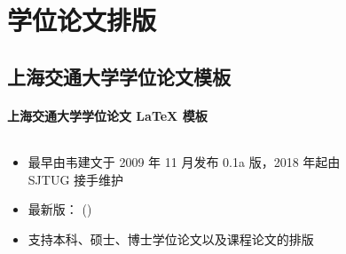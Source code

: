 

\section{学位论文排版}
\subsection{\SJTUThesis 上海交通大学学位论文模板}

\begin{frame}{\SJTUThesis}
  \framesubtitle{上海交通大学学位论文 \LaTeX{} 模板}
  \begin{columns}
    \begin{column}{.7\textwidth}
      \begin{itemize}
        \item 最早由韦建文于 2009 年 11 月发布 0.1a 版，2018 年起由 SJTUG 接手维护
        \item 最新版：\SJTUThesisVersion{} (\SJTUThesisDate)
        \item 支持本科、硕士、博士学位论文以及课程论文的排版
      \end{itemize}
    \end{column}
    \begin{column}{.2\textwidth}
      \begin{figure}[htbp]
        \centering
        {
          \setlength{\fboxsep}{0pt}
        }
      \end{figure}
    \end{column}
  \end{columns}
\end{frame}


